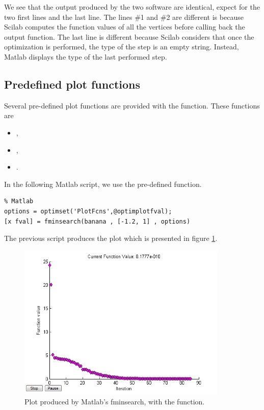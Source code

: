 We see that the output produced by the two software are identical,
expect for the two first lines and the last line.
The lines \#1 and \#2 are different is because Scilab computes the 
function values of all the vertices before calling back the output function.
The last line is different because Scilab considers that once the optimization
is performed, the type of the step is an empty string. Instead, Matlab
displays the type of the last performed step.

\subsection{Predefined plot functions}


Several pre-defined plot functions are provided with 
the  function.
These functions are 
\begin{itemize}
\item {},
\item {},
\item {}.
\end{itemize}

In the following Matlab script, we use the 
pre-defined function.

\lstset{language=matlabscript}
\begin{lstlisting}
% Matlab
options = optimset('PlotFcns',@optimplotfval);
[x fval] = fminsearch(banana , [-1.2, 1] , options)
\end{lstlisting}

The previous script produces the plot which is presented in figure 
\ref{fig-fminsearch-matlab-optimplotfval}.

\begin{figure}
\begin{center}
\includegraphics[width=10cm]{fminsearch/testFminsearchOptimplotfvalMatlab.png}
\end{center}
\caption{Plot produced by Matlab's fminsearch, with the  function.}
\label{fig-fminsearch-matlab-optimplotfval}
\end{figure}

